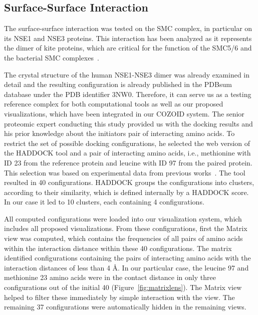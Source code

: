 \documentclass{bmcart}
\def\MatView {Matrix view\xspace}
\begin{document}
\subsection{Surface-Surface Interaction}
The surface-surface interaction was tested on the SMC complex, in particular on its NSE1 and NSE3 proteins. 
This interaction has been analyzed as it represents the dimer of kite proteins, which are critical for the function of the SMC5/6 and the bacterial SMC complexes~\cite{Zabrady2016,Palecek2015,Doyle2010}. 

The crystal structure of the human NSE1-NSE3 dimer was already examined in detail and the resulting configuration is already published in the PDBsum database under the PDB identifier 3NW0. 
Therefore, it can serve us as a testing reference complex for both computational tools as well as our proposed visualizations, which have been integrated in our COZOID system.
The senior proteomic expert conducting this study provided us with the docking results and his prior knowledge about the initiators pair of interacting amino acids.
To restrict the set of possible docking configurations, he selected the web version of the HADDOCK tool and a pair of interacting amino acids, i.e., methionine with ID 23 from the reference protein and leucine with ID 97 from the paired protein.
This selection was based on experimental data from previous works~\cite{Hudson2011,Kozakova,Crabben}.
The tool resulted in 40 configurations.
HADDOCK groups the configurations into clusters, according to their similarity, which is defined internally by a HADDOCK score.
In our case it led to 10 clusters, each containing 4 configurations.

All computed configurations were loaded into our visualization system, which includes all proposed visualizations.
From these configurations, first the \MatView was computed, which contains the frequencies of all pairs of amino acids within the interaction distance within these 40 configurations.
The matrix identified configurations containing the pairs of interacting amino acids with the interaction distances of less than 4 \AA.
In our particular case, the leucine 97 and methionine 23 amino acids were in the contact distance in only three configurations out of the initial 40 (Figure~\ref{fig:matrixlens}). 
The Matrix view helped to filter these immediately by simple interaction with the view. 
The remaining 37 configurations were automatically hidden in the remaining views.
\end{document}
